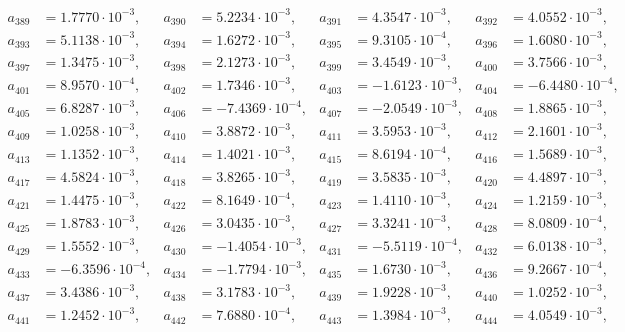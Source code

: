 \begin{align*}
a_{ 389 } &= 1.7770 \cdot 10^{ -3 }, & a_{ 390 } &= 5.2234 \cdot 10^{ -3 }, & a_{ 391 } &= 4.3547 \cdot 10^{ -3 }, & a_{ 392 } &= 4.0552 \cdot 10^{ -3 },\\ 
a_{ 393 } &= 5.1138 \cdot 10^{ -3 }, & a_{ 394 } &= 1.6272 \cdot 10^{ -3 }, & a_{ 395 } &= 9.3105 \cdot 10^{ -4 }, & a_{ 396 } &= 1.6080 \cdot 10^{ -3 },\\ 
a_{ 397 } &= 1.3475 \cdot 10^{ -3 }, & a_{ 398 } &= 2.1273 \cdot 10^{ -3 }, & a_{ 399 } &= 3.4549 \cdot 10^{ -3 }, & a_{ 400 } &= 3.7566 \cdot 10^{ -3 },\\ 
a_{ 401 } &= 8.9570 \cdot 10^{ -4 }, & a_{ 402 } &= 1.7346 \cdot 10^{ -3 }, & a_{ 403 } &= -1.6123 \cdot 10^{ -3 }, & a_{ 404 } &= -6.4480 \cdot 10^{ -4 },\\ 
a_{ 405 } &= 6.8287 \cdot 10^{ -3 }, & a_{ 406 } &= -7.4369 \cdot 10^{ -4 }, & a_{ 407 } &= -2.0549 \cdot 10^{ -3 }, & a_{ 408 } &= 1.8865 \cdot 10^{ -3 },\\ 
a_{ 409 } &= 1.0258 \cdot 10^{ -3 }, & a_{ 410 } &= 3.8872 \cdot 10^{ -3 }, & a_{ 411 } &= 3.5953 \cdot 10^{ -3 }, & a_{ 412 } &= 2.1601 \cdot 10^{ -3 },\\ 
a_{ 413 } &= 1.1352 \cdot 10^{ -3 }, & a_{ 414 } &= 1.4021 \cdot 10^{ -3 }, & a_{ 415 } &= 8.6194 \cdot 10^{ -4 }, & a_{ 416 } &= 1.5689 \cdot 10^{ -3 },\\ 
a_{ 417 } &= 4.5824 \cdot 10^{ -3 }, & a_{ 418 } &= 3.8265 \cdot 10^{ -3 }, & a_{ 419 } &= 3.5835 \cdot 10^{ -3 }, & a_{ 420 } &= 4.4897 \cdot 10^{ -3 },\\ 
a_{ 421 } &= 1.4475 \cdot 10^{ -3 }, & a_{ 422 } &= 8.1649 \cdot 10^{ -4 }, & a_{ 423 } &= 1.4110 \cdot 10^{ -3 }, & a_{ 424 } &= 1.2159 \cdot 10^{ -3 },\\ 
a_{ 425 } &= 1.8783 \cdot 10^{ -3 }, & a_{ 426 } &= 3.0435 \cdot 10^{ -3 }, & a_{ 427 } &= 3.3241 \cdot 10^{ -3 }, & a_{ 428 } &= 8.0809 \cdot 10^{ -4 },\\ 
a_{ 429 } &= 1.5552 \cdot 10^{ -3 }, & a_{ 430 } &= -1.4054 \cdot 10^{ -3 }, & a_{ 431 } &= -5.5119 \cdot 10^{ -4 }, & a_{ 432 } &= 6.0138 \cdot 10^{ -3 },\\ 
a_{ 433 } &= -6.3596 \cdot 10^{ -4 }, & a_{ 434 } &= -1.7794 \cdot 10^{ -3 }, & a_{ 435 } &= 1.6730 \cdot 10^{ -3 }, & a_{ 436 } &= 9.2667 \cdot 10^{ -4 },\\ 
a_{ 437 } &= 3.4386 \cdot 10^{ -3 }, & a_{ 438 } &= 3.1783 \cdot 10^{ -3 }, & a_{ 439 } &= 1.9228 \cdot 10^{ -3 }, & a_{ 440 } &= 1.0252 \cdot 10^{ -3 },\\ 
a_{ 441 } &= 1.2452 \cdot 10^{ -3 }, & a_{ 442 } &= 7.6880 \cdot 10^{ -4 }, & a_{ 443 } &= 1.3984 \cdot 10^{ -3 }, & a_{ 444 } &= 4.0549 \cdot 10^{ -3 },\\ 

\end{align*}

